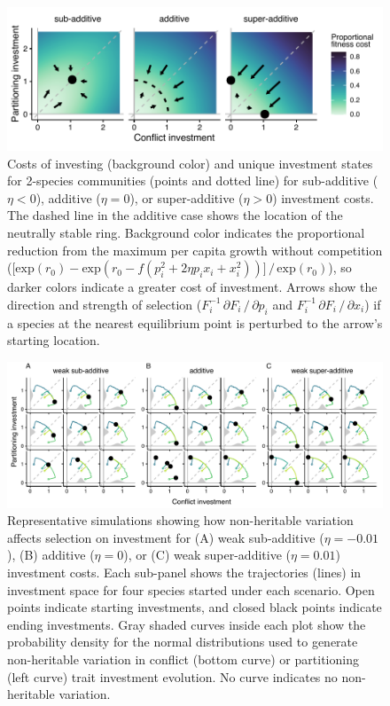 \documentclass[11pt]{article}
\begin{document}
\clearpage


\begin{figure}[ht!]
\centering
\includegraphics[width=\textwidth,keepaspectratio]{2-tradeoffs_outcomes}
\caption{Costs of investing (background color) and unique
investment states for 2-species communities (points and dotted line) for
sub-additive ($\eta < 0$), additive ($\eta = 0$), or super-additive
($\eta > 0$) investment costs. The dashed line in the additive case
shows the location of the neutrally stable ring. Background color
indicates the proportional reduction from the maximum per capita growth without
competition
($\lbrack \text{exp}( r_{0} ) - \text{exp}( r_{0} - f( p_{i}^{2} + 2 \eta p_{i} x_{i} + x_{i}^{2} ) ) \rbrack \, / \, \text{exp}( r_{0} )$),
so darker colors indicate a greater cost of investment. Arrows show the
direction and strength of selection
($F_{i}^{- 1} \, \partial F_{i} \, / \, \partial p_{i}$ and
$F_{i}^{- 1} \, \partial F_{i} \, / \, \partial x_{i}$) if a species at the
nearest equilibrium point is perturbed to the arrow's starting location.}
\label{fig:tradeoffs-outcomes}
\end{figure}



\clearpage


\begin{figure}[ht!]
\centering
\includegraphics[width=\textwidth,keepaspectratio]{3-all_stoch}
\caption{Representative simulations showing how non-heritable
variation affects selection on investment for (A) weak sub-additive
($\eta = - 0.01$), (B) additive ($\eta = 0$), or (C) weak
super-additive ($\eta = 0.01$) investment costs. Each sub-panel shows
the trajectories (lines) in investment space for four species started
under each scenario. Open points indicate starting investments, and
closed black points indicate ending investments. Gray shaded curves
inside each plot show the probability density for the normal
distributions used to generate non-heritable variation in conflict (bottom
curve) or partitioning (left curve) trait investment evolution. No curve
indicates no non-heritable variation.}
\label{fig:non-heritable}
\end{figure}
\end{document}
